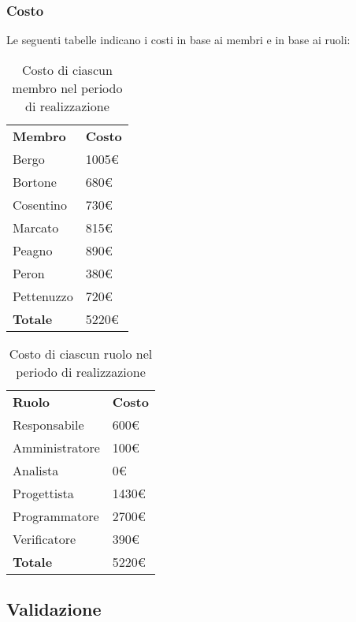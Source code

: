 	\subsubsection{Costo}
		Le seguenti tabelle indicano i costi in base ai membri e in base ai ruoli:
		\begin{table}[h]
		\centering
		\begin{tabular}{| l | l |}
			\rowcolor{LightBlue}
			\textbf{\color{white}Membro}
			& \textbf{\color{white}Costo}\\
			
			Bergo & 1005€\\
			Bortone & 680€\\
			Cosentino & 730€\\
			Marcato & 815€\\
			Peagno & 890€\\
			Peron & 380€\\
			Pettenuzzo & 720€\\ \hline
			\textbf{Totale} & 5220€\\ \hline
		\end{tabular}
		\caption{Costo di ciascun membro nel periodo di realizzazione}
		\end{table}
		
		\begin{table}[h]
		\centering
		\begin{tabular}{| l | l |}
			\rowcolor{LightBlue}
			\textbf{\color{white}Ruolo}
			& \textbf{\color{white}Costo}\\
			
			Responsabile 		& 600€\\
			Amministratore 	& 100€\\
			Analista 				& 0€\\			
			Progettista 			& 1430€\\
			Programmatore 		& 2700€\\
			Verificatore 		& 390€\\ \hline
			\textbf{Totale} 	& 5220€\\ \hline
		\end{tabular}
		\caption{Costo di ciascun ruolo nel periodo di realizzazione}
		\end{table}
		
\newpage
\subsection{Validazione}
